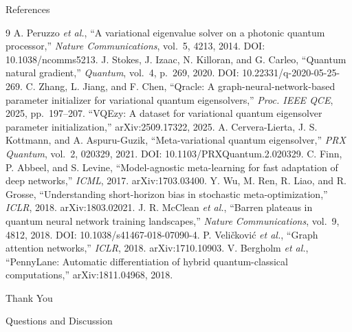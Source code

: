 \documentclass[aspectratio=169,11pt]{beamer}
\begin{document}
\begin{frame}[allowframebreaks]{References}
  \footnotesize
  \begin{thebibliography}{9}
     A. Peruzzo \emph{et al.}, ``A variational eigenvalue solver on a photonic quantum processor,'' \emph{Nature Communications}, vol.~5, 4213, 2014. DOI: 10.1038/ncomms5213.
     J. Stokes, J. Izaac, N. Killoran, and G. Carleo, ``Quantum natural gradient,'' \emph{Quantum}, vol.~4, p.~269, 2020. DOI: 10.22331/q-2020-05-25-269.
     C. Zhang, L. Jiang, and F. Chen, ``Qracle: A graph-neural-network-based parameter initializer for variational quantum eigensolvers,'' \emph{Proc. IEEE QCE}, 2025, pp.~197--207.
     ``VQEzy: A dataset for variational quantum eigensolver parameter initialization,'' arXiv:2509.17322, 2025.
     A. Cervera-Lierta, J. S. Kottmann, and A. Aspuru-Guzik, ``Meta-variational quantum eigensolver,'' \emph{PRX Quantum}, vol.~2, 020329, 2021. DOI: 10.1103/PRXQuantum.2.020329.
     C. Finn, P. Abbeel, and S. Levine, ``Model-agnostic meta-learning for fast adaptation of deep networks,'' \emph{ICML}, 2017. arXiv:1703.03400.
     Y. Wu, M. Ren, R. Liao, and R. Grosse, ``Understanding short-horizon bias in stochastic meta-optimization,'' \emph{ICLR}, 2018. arXiv:1803.02021.
     J. R. McClean \emph{et al.}, ``Barren plateaus in quantum neural network training landscapes,'' \emph{Nature Communications}, vol.~9, 4812, 2018. DOI: 10.1038/s41467-018-07090-4.
     P. Veli\v{c}kovi\'{c} \emph{et al.}, ``Graph attention networks,'' \emph{ICLR}, 2018. arXiv:1710.10903.
     V. Bergholm \emph{et al.}, ``PennyLane: Automatic differentiation of hybrid quantum-classical computations,'' arXiv:1811.04968, 2018.
  \end{thebibliography}
\end{frame}

\begin{frame}[plain]
  \centering
  \vfill
  {\color{UniversityBlue}\Huge Thank You}\par
  \vspace{0.5cm}
  {\Large Questions and Discussion}\par
  \vspace{0.8cm}
  \vfill
\end{frame}
\end{document}
